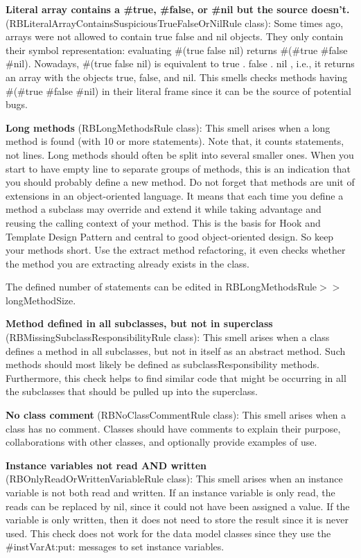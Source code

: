 \textbf{Literal array contains a #true, #false, or #nil but the source doesn't.} (RBLiteralArrayContainsSuspiciousTrueFalseOrNilRule class): Some times ago, arrays were not allowed to contain true false and nil objects. They only contain their symbol representation: evaluating \#(true false nil) returns \#(\#true \#false \#nil). 
	Nowadays, \#(true false nil) is equivalent to {true . false . nil }, i.e., it returns an array with the objects true, false, and nil. 
	This smells checks methods having \#(\#true \#false \#nil) in their literal frame since it can be the source of potential bugs. 
	 

\textbf{Long methods} (RBLongMethodsRule class): This smell arises when a long method is found (with 10 or more statements). Note that, it counts statements, not lines. Long methods should often be split into several smaller ones. When you start to have empty line to separate groups of methods, this is an indication that you should probably define a new method. 
	Do not forget that methods are unit of extensions in an object-oriented language. It means that each time you define a method a subclass may override and extend it while taking advantage and reusing the calling context of your method. This is the basis for Hook and Template Design Pattern and central to good object-oriented design. So keep your methods short. 
	Use the extract method refactoring, it even checks whether the method you are extracting already exists in the class. 
	
	The defined number of statements can be edited in RBLongMethodsRule$>>$longMethodSize.

\textbf{Method defined in all subclasses, but not in superclass} (RBMissingSubclassResponsibilityRule class): This smell arises when a class defines a method in all subclasses, but not in itself as an abstract method. Such methods should most likely be defined as subclassResponsibility methods. Furthermore, this check helps to find similar code that might be occurring in all the subclasses that should be pulled up into the superclass.

\textbf{No class comment} (RBNoClassCommentRule class): This smell arises when a class has no comment. Classes should have comments to explain their purpose, collaborations with other classes, and optionally provide examples of use.

\textbf{Instance variables not read AND written} (RBOnlyReadOrWrittenVariableRule class): This smell arises when an instance variable is not both read and written. If an instance variable is only read, the reads can be replaced by nil, since it could not have been assigned a value. If the variable is only written, then it does not need to store the result since it is never used. This check does not work for the data model classes since they use the \#instVarAt:put: messages to set instance variables.

